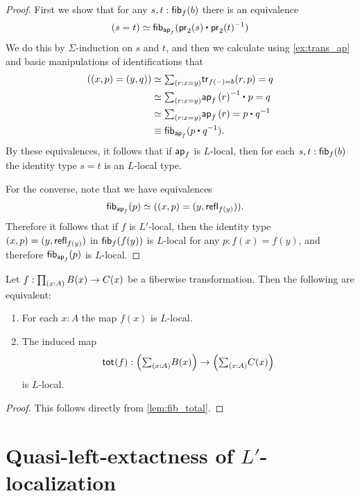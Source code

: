 \begin{proof}
First we show that for any $s,t:\mathsf{fib}_{f}(b)$ there is an equivalence
\begin{equation*}
\eqv{(s=t)}{\fib{\apfunc{f}}{\ct{\proj 2(s)}{\proj 2(t)^{-1}}}}
\end{equation*}
We do this by $\Sigma$-induction on $s$ and $t$, and then we calculate using \cref{ex:trans_ap} and basic manipulations of identifications that
\begin{align*}
(\pairr{x,p}=\pairr{y,q}) & \eqvsym \sm{r:x=y} \mathsf{tr}_{f(\blank)=b}(r,p)=q \\
& \eqvsym \sm{r:x=y} \ct{\ap{f}{r}^{-1}}{p}=q \\
& \eqvsym \sm{r:x=y} \ap{f}{r}=\ct{p}{q^{-1}} \\
& \jdeq \fib{\apfunc{f}}{\ct{p}{q^{-1}}}.
\end{align*}
By these equivalences, it follows that if $\mathsf{ap}_{f}$ is $L$-local, then for each $s,t:\mathsf{fib}_{f}(b)$ the identity type $s=t$ is an $L$-local type.

For the converse, note that we have equivalences
\begin{align*}
\mathsf{fib}_{\mathsf{ap}_{f}}(p) & \simeq ((x,p)=(y,\mathsf{refl}_{f(y)})).
\end{align*}
Therefore it follows that if $f$ is $L'$-local, then the identity type $(x,p)=(y,\mathsf{refl}_{f(y)})$ in $\mathsf{fib}_{f}(f(y))$ is $L$-local for any $p:f(x)=f(y)$, and therefore $\mathsf{fib}_{\mathsf{ap}_{f}}(p)$ is $L$-local. 
\end{proof}

\begin{thm}
Let $f:\prd{x:A}B(x)\to C(x)$ be a fiberwise transformation. Then the following are equivalent:
\begin{enumerate}
\item For each $x:A$ the map $f(x)$ is $L$-local.
\item The induced map 
\begin{equation*}
\total{f}:\Big(\sm{x:A}B(x)\Big)\to\Big(\sm{x:A}C(x)\Big)
\end{equation*}
is $L$-local.
\end{enumerate}
\end{thm}

\begin{proof}
This follows directly from \cref{lem:fib_total}.
\end{proof}

\section{Quasi-left-extactness of $L'$-localization}\label{ss:lex}

